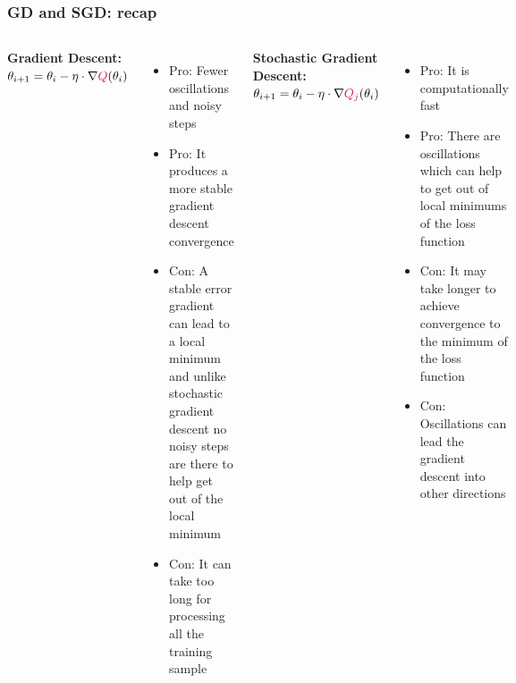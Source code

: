 \documentclass[12pt, aspectratio = 169]{beamer}
\newcommand{\red}{\color{calmRed}}
\newcommand{\black}{\color{black}}
\begin{document}
\begin{frame}
	\frametitle{GD and SGD: recap}
	\begin{columns}[T]
	    \begin{minipage}[t]{\linewidth}
	        \begin{center}
	            \textbf{Gradient Descent:\\}
                $\theta_{i+1} = \theta_i - \eta \cdot \nabla \red Q \black (\theta_i)$
            \end{center}
            \begin{itemize}
	            \item Pro: Fewer oscillations and noisy steps
	            \item Pro: It produces a more stable gradient descent convergence
	            \item[\textcolor{red}{\textbullet}] Con: A stable error gradient can lead to a local minimum and unlike stochastic gradient descent no noisy steps are there to help get out of the local minimum
	            \item[\textcolor{red}{\textbullet}] Con: It can take too long for processing all the training sample
	        \end{itemize}
        \end{minipage}
    	\begin{minipage}[t]{\linewidth}
    	    \begin{center}
                \textbf{Stochastic Gradient Descent:\\}
                $\theta_{i+1} = \theta_i - \eta \cdot \nabla \red Q_j \black (\theta_i)$
            \end{center}
            \begin{itemize}
	            \item Pro: It is computationally fast
	            \item Pro: There are oscillations which can help to get out of local minimums of the loss function
	            \item[\textcolor{red}{\textbullet}] Con: It may take longer to achieve convergence to the minimum of the loss function
	            \item[\textcolor{red}{\textbullet}] Con: Oscillations can lead the gradient descent into other directions
	        \end{itemize}
        \end{minipage}
    \end{columns}
\end{frame}
\end{document}
